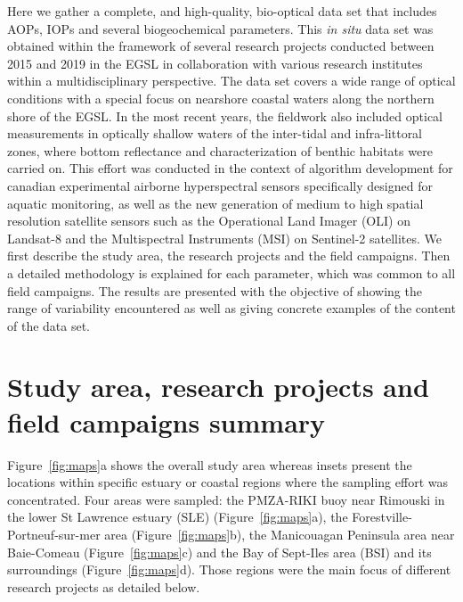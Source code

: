 \documentclass[essd, manuscript]{copernicus}
\begin{document}
Here we gather a complete, and high-quality, bio-optical data set that includes AOPs, IOPs and several biogeochemical parameters. This \textit{in situ} data set was obtained within the framework of several research projects conducted between 2015 and 2019 in the EGSL in collaboration with various research institutes within a multidisciplinary perspective. The data set covers a wide range of optical conditions with a special focus on nearshore coastal waters along the northern shore of the EGSL. In the most recent years, the fieldwork also included optical measurements in optically shallow waters of the inter-tidal and infra-littoral zones, where bottom reflectance and characterization of benthic habitats were carried on. This effort was conducted in the context of algorithm development for canadian experimental airborne hyperspectral sensors specifically designed for aquatic monitoring, as well as the new generation of medium to high spatial resolution satellite sensors such as the Operational Land Imager (OLI) on Landsat-8 and the Multispectral Instruments (MSI) on Sentinel-2 satellites. We first describe the study area, the research projects and the field campaigns. Then a detailed methodology is explained for each parameter, which was common to all field campaigns. The results are presented with the objective of showing the range of variability encountered as well as giving concrete examples of the content of the data set. 



\section{Study area, research projects and field campaigns summary}
Figure~\ref{fig:maps}a shows the overall study area whereas insets present the locations within specific estuary or coastal regions where the sampling effort was concentrated. Four areas were sampled: the PMZA-RIKI buoy near Rimouski in the lower St Lawrence estuary (SLE) (Figure~\ref{fig:maps}a), the Forestville-Portneuf-sur-mer area (Figure~\ref{fig:maps}b), the Manicouagan Peninsula area near Baie-Comeau (Figure~\ref{fig:maps}c) and the Bay of Sept-Iles area (BSI) and its surroundings (Figure~\ref{fig:maps}d). Those regions were the main focus of different research projects as detailed below.
\end{document}
